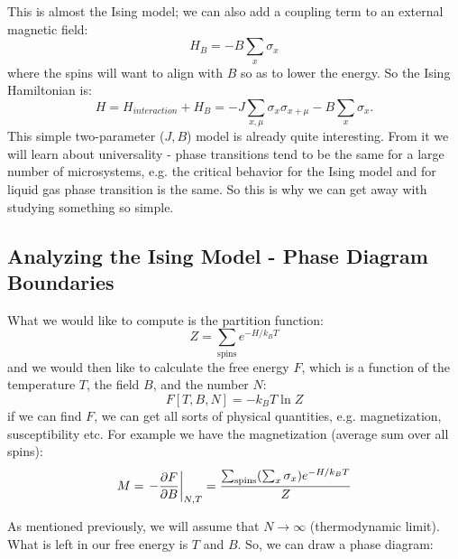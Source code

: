 This is almost the Ising model; we can also add a coupling term to an external magnetic field:
\begin{equation}
    H_{B} = -B\sum_x \sigma_x
\end{equation}
where the spins will want to align with $B$ so as to lower the energy. So the Ising Hamiltonian is:
\begin{equation}
    H = H_{interaction} + H_{B} = -J \sum_{x, \mu}\sigma_{x}\sigma_{x+\mu} - B\sum_x \sigma_x.
\end{equation}
This simple two-parameter ($J, B$) model is already quite interesting. From it we will learn about universality - phase transitions tend to be the same for a large number of microsystems, e.g. the critical behavior for the Ising model and for liquid gas phase transition is the same. So this is why we can get away with studying something so simple.

\subsection{Analyzing the Ising Model - Phase Diagram Boundaries}
What we would like to compute is the partition function:
\begin{equation}
    Z = \sum_{\text{spins}}e^{-H/k_B T}
\end{equation}
and we would then like to calculate the free energy $F$, which is a function of the temperature $T$, the field $B$, and the number $N$:
\begin{equation}
F[T, B, N] = -k_B T \ln Z
\end{equation}
if we can find $F$, we can get all sorts of physical quantities, e.g. magnetization, susceptibility etc. For example we have the magnetization (average sum over all spins):
\begin{equation}\label{eq-magnetization}
    M = \left.-\frac{\partial F}{\partial B}\right|_{N, T} = \frac{\sum_{\text{spins}}(\sum_x \sigma_x)e^{-H/k_B T}}{Z}
\end{equation}

As mentioned previously, we will assume that $N \to \infty$ (thermodynamic limit). What is left in our free energy is $T$ and $B$. So, we can draw a phase diagram:

